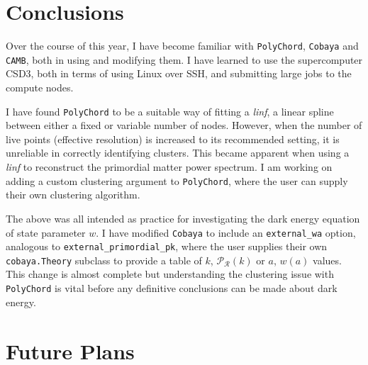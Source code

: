 \documentclass{article}
\begin{document}
\section{Conclusions}

Over the course of this year, I have become familiar with \texttt{PolyChord}, \texttt{Cobaya} and \texttt{CAMB}, both in using and modifying them. I have learned to use the supercomputer CSD3, both in terms of using Linux over SSH, and submitting large jobs to the compute nodes. 

I have found \texttt{PolyChord} to be a suitable way of fitting a \textit{linf}, a linear spline between either a fixed or variable number of nodes. However, when the number of live points (effective resolution) is increased to its recommended setting, it is unreliable in correctly identifying clusters. This became apparent when using a \textit{linf} to reconstruct the primordial matter power spectrum. I am working on adding a custom clustering argument to \texttt{PolyChord}, where the user can supply their own clustering algorithm.

The above was all intended as practice for investigating the dark energy equation of state parameter $w$. I have modified \texttt{Cobaya} to include an \texttt{external\_wa} option, analogous to \texttt{external\_primordial\_pk}, where the user supplies their own \texttt{cobaya.Theory} subclass to provide a table of $k$, $\mathcal P_\mathcal R(k)$ or $a$, $w(a)$ values. This change is almost complete but understanding the clustering issue with \texttt{PolyChord} is vital before any definitive conclusions can be made about dark energy.

\section{Future Plans}
\end{document}
